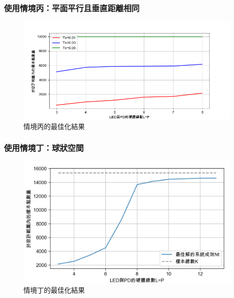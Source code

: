 
    \subsubsection{使用情境丙：平面平行且垂直距離相同}
    \label{chp:optimiza_C}

    \begin{figure}[htpb]
        \centering
        \includegraphics[width=15cm]{ch5pic/optimize_C.png}
        \caption{情境丙的最佳化結果}
        \label{pic:opt_C_line}
    \end{figure}

    \subsubsection{使用情境丁：球狀空間}
    \label{chp:optimiza_D}

    \begin{figure}[htpb]
        \centering
        \includegraphics[width=15cm]{ch5pic/optimize_d.png}
        \caption{情境丁的最佳化結果}
        \label{pic:opt_D}
    \end{figure}

